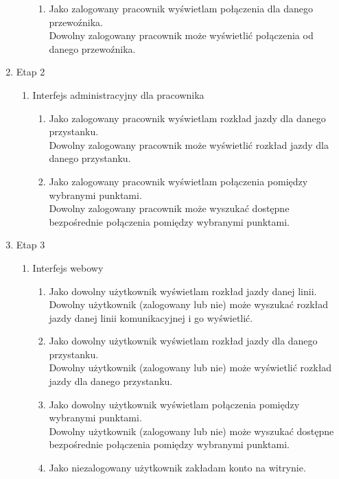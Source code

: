 \documentclass[10pt,a4paper]{article}
\begin{document}
\begin{enumerate}
\begin{enumerate}[label*=\arabic*.]
\begin{enumerate}[label*=\arabic*.]
	    	\item Jako zalogowany pracownik wyświetlam połączenia dla danego przewoźnika. \\
			    Dowolny zalogowany pracownik może wyświetlić połączenia od danego przewoźnika.
		\end{enumerate}
	\end{enumerate}
	\item Etap 2
	\begin{enumerate}[label*=\arabic*.]
		\item Interfejs administracyjny dla pracownika
		\begin{enumerate}[label*=\arabic*.]
			\mdseries
		 	\item Jako zalogowany pracownik wyświetlam rozkład jazdy dla danego przystanku. \\
			    Dowolny zalogowany pracownik może wyświetlić rozkład jazdy dla danego przystanku.
		 	\item Jako zalogowany pracownik wyświetlam połączenia pomiędzy wybranymi punktami. \\
			    Dowolny zalogowany pracownik może wyszukać dostępne bezpośrednie połączenia pomiędzy wybranymi punktami. 
		\end{enumerate}
	\end{enumerate}
	\item Etap 3
	\begin{enumerate}[label*=\arabic*.]
		\item Interfejs webowy
		\begin{enumerate}[label*=\arabic*.]
			\mdseries
		 	\item Jako dowolny użytkownik wyświetlam rozkład jazdy danej linii. \\
			    Dowolny użytkownik (zalogowany lub nie) może wyszukać rozkład jazdy danej linii
			    komunikacyjnej i go wyświetlić.
		 	\item Jako dowolny użytkownik wyświetlam rozkład jazdy dla danego przystanku. \\
			    Dowolny użytkownik (zalogowany lub nie) może wyświetlić rozkład jazdy dla danego przystanku.
		 	\item Jako dowolny użytkownik wyświetlam połączenia pomiędzy wybranymi punktami. \\
			    Dowolny użytkownik (zalogowany lub nie) może wyszukać dostępne bezpośrednie połączenia pomiędzy wybranymi punktami.
		 	\item Jako niezalogowany użytkownik zakładam konto na witrynie. \\

\end{enumerate}
\end{enumerate}
\end{enumerate}
\end{document}
